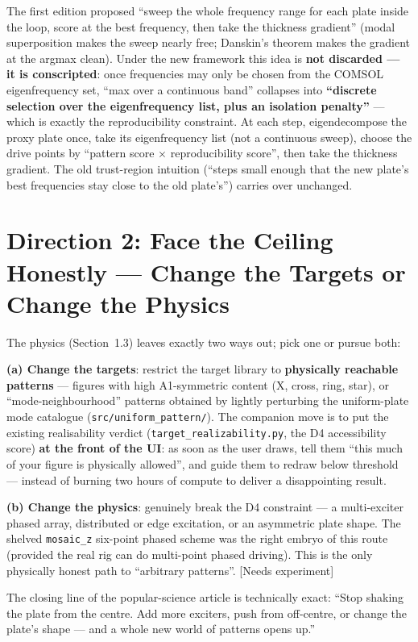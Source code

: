 \documentclass[11pt,a4paper]{article}
\newcommand{\code}[1]{\texttt{#1}}
\begin{document}
The first edition proposed ``sweep the whole frequency range for each plate inside the loop, score at the best frequency, then take the thickness gradient'' (modal superposition makes the sweep nearly free; Danskin's theorem makes the gradient at the argmax clean). Under the new framework this idea is \textbf{not discarded --- it is conscripted}: once frequencies may only be chosen from the COMSOL eigenfrequency set, ``max over a continuous band'' collapses into \textbf{``discrete selection over the eigenfrequency list, plus an isolation penalty''} --- which is exactly the reproducibility constraint. At each step, eigendecompose the proxy plate once, take its eigenfrequency list (not a continuous sweep), choose the drive points by ``pattern score $\times$ reproducibility score'', then take the thickness gradient. The old trust-region intuition (``steps small enough that the new plate's best frequencies stay close to the old plate's'') carries over unchanged.

\section{Direction 2: Face the Ceiling Honestly --- Change the Targets or Change the Physics}

The physics (Section~1.3) leaves exactly two ways out; pick one or pursue both:

\textbf{(a) Change the targets}: restrict the target library to \textbf{physically reachable patterns} --- figures with high A1-symmetric content (X, cross, ring, star), or ``mode-neighbourhood'' patterns obtained by lightly perturbing the uniform-plate mode catalogue (\code{src/uniform\_pattern/}). The companion move is to put the existing realisability verdict (\code{target\_realizability.py}, the D4 accessibility score) \textbf{at the front of the UI}: as soon as the user draws, tell them ``this much of your figure is physically allowed'', and guide them to redraw below threshold --- instead of burning two hours of compute to deliver a disappointing result.

\textbf{(b) Change the physics}: genuinely break the D4 constraint --- a multi-exciter phased array, distributed or edge excitation, or an asymmetric plate shape. The shelved \code{mosaic\_z} six-point phased scheme was the right embryo of this route (provided the real rig can do multi-point phased driving). This is the only physically honest path to ``arbitrary patterns''. [Needs experiment]

The closing line of the popular-science article is technically exact: ``Stop shaking the plate from the centre. Add more exciters, push from off-centre, or change the plate's shape --- and a whole new world of patterns opens up.''
\end{document}
